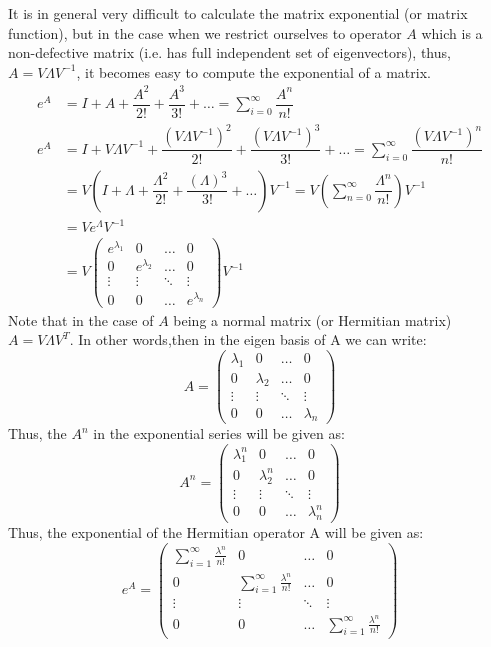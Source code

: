 It is in general very difficult to calculate the matrix exponential (or matrix function), but in the case when we restrict ourselves to operator $A$ which is a non-defective matrix (i.e. has full independent set of eigenvectors), thus, $A=V\Lambda V^{-1}$, it becomes easy to compute the exponential of a matrix.
\begin{align*} 
e^A&=I+A+\dfrac{A^2}{2!}+\dfrac{A^3}{3!}+\ldots = \sum_{i=0}^{\infty} \dfrac{A^n}{n!}\\
e^A&=I+V\Lambda V^{-1} +\dfrac{(V\Lambda V^{-1})^2}{2!}+ \dfrac{(V\Lambda V^{-1})^3}{3!}+\ldots = \sum_{i=0}^{\infty} \dfrac{(V\Lambda V^{-1})^n}{n!}\\
&=V\left(I+\Lambda + \dfrac{\Lambda^2}{2!}+\dfrac{(\Lambda)^3}{3!}+\ldots\right)V^{-1} = V\left(\sum_{n=0}^{\infty} \dfrac{\Lambda^n}{n!}\right)V^{-1}\\
&=Ve^{\Lambda}V^{-1}\\
&=V\begin{pmatrix} e^{\lambda_1} & 0 & \ldots & 0 \\ 0 & e^{\lambda_2} & \ldots & 0 \\ \vdots & \vdots & \ddots & \vdots \\ 0 & 0 & \ldots & e^{\lambda_n} \end{pmatrix} V^{-1} 
\end{align*}
Note that  in the case of $A$ being a normal matrix (or Hermitian matrix) $A=V\Lambda V^T$.
In other words,then in the eigen basis of A we can write: 
\[ A=\begin{pmatrix} \lambda_1 & 0 & \ldots & 0 \\ 0 & \lambda_2 & \ldots & 0 \\ \vdots & \vdots & \ddots & \vdots \\ 0 & 0 & \ldots & \lambda_n \end{pmatrix} \]
Thus, the $A^n$ in the exponential series will be given as:
\[ A^n=\begin{pmatrix} \lambda_1^n & 0 & \ldots & 0 \\ 0 & \lambda_2^n & \ldots & 0 \\ \vdots & \vdots & \ddots & \vdots \\ 0 & 0 & \ldots & \lambda_n^n \end{pmatrix} \]
Thus, the exponential of the Hermitian operator A will be given as:
\[ e^A=\begin{pmatrix} \sum_{i=1}^{\infty} \frac{\lambda^n}{n!} & 0 & \ldots & 0 \\ 0 & \sum_{i=1}^{\infty} \frac{\lambda^n}{n!} & \ldots & 0 \\ \vdots & \vdots & \ddots & \vdots \\ 0 & 0 & \ldots & \sum_{i=1}^{\infty} \frac{\lambda^n}{n!} \end{pmatrix} \]
